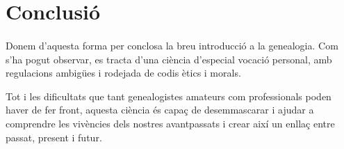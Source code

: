 \section{Conclusió}

    \paragraph{}
    Donem d'aquesta forma per conclosa la breu introducció a la genealogia. Com s'ha pogut observar, es tracta d'una ciència d'especial vocació personal, amb regulacions ambigües i rodejada de codis ètics i morals.

    Tot i les dificultats que tant genealogistes amateurs com professionals poden haver de fer front, aquesta ciència és capaç de desemmascarar i ajudar a comprendre les vivències dels nostres avantpassats i crear així un enllaç entre passat, present i futur. 
